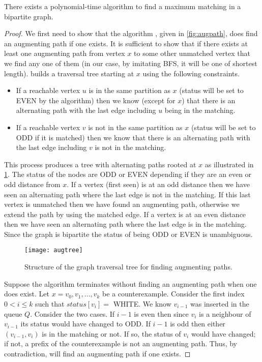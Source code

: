 \begin{Theorem}
There exists a polynomial-time algorithm to find a maximum matching
in a bipartite graph.
\end{Theorem}
\begin{proof}
We first need to show that the algorithm , given in
\cref{fig:augpath}, does find an augmenting path if one exists.
It is sufficient to show that if there exists at least one augmenting path 
from vertex $x$ to some other unmatched vertex that we find any one of them 
(in our case, by imitating BFS, it will be one of shortest length).  
builds a traversal tree starting at $x$ using the following constraints.
\begin{itemize}
\item If a reachable vertex $u$ is in the same partition as $x$ (status will
be set to EVEN by the algorithm) then we know (except for $x$) that there is 
an alternating path with the last edge including $u$ being in the matching.
\item If a reachable vertex $v$ is not in the same partition as $x$ (status will
be set to ODD if it is matched) then we know that there is 
an alternating path with the last edge including $v$ is not in the matching.
\end{itemize}
This process produces a tree with alternating paths rooted at $x$ as 
illustrated in \cref{fig:augtree}.  The status of the nodes are ODD 
or EVEN depending if they are an even or odd distance from $x$.  If a vertex 
(first seen) is at an odd distance then we have seen an alternating path 
where the last edge is not in the matching.  If this last vertex is unmatched 
then we have found an augmenting path, otherwise we extend the path by using 
the matched edge.  
If a vertex is at an even distance then we have seen an alternating path
where the last edge is in the matching.  Since the graph is bipartite the
status of being ODD or EVEN is unambiguous.

\begin{figure}
\centering
\texttt{[image: augtree]} 
\caption{Structure of the graph traversal tree for finding augmenting paths.}
\label{fig:augtree}
\end{figure}

Suppose the algorithm  terminates without
finding an augmenting path when one does exist.  Let $x=v_0,v_1,\ldots,v_k$
be a counterexample.  Consider the
first index $0<i\leq k$ such that $status[v_i] =$ WHITE.  We know $v_{i-1}$ was
inserted in the queue $Q$. Consider the two cases.  If $i-1$ is even then
since $v_i$ is a neighbour of $v_{i-1}$ its status would have changed to
ODD.
If $i-1$ is odd then either $(v_{i-1},v_i)$ is in the matching or not.
If so, the status of $v_i$ would have changed; if not, a prefix of the 
counterexample is not an augmenting path.  Thus, by contradiction,
 will find an augmenting path if one exists.


\end{proof}
